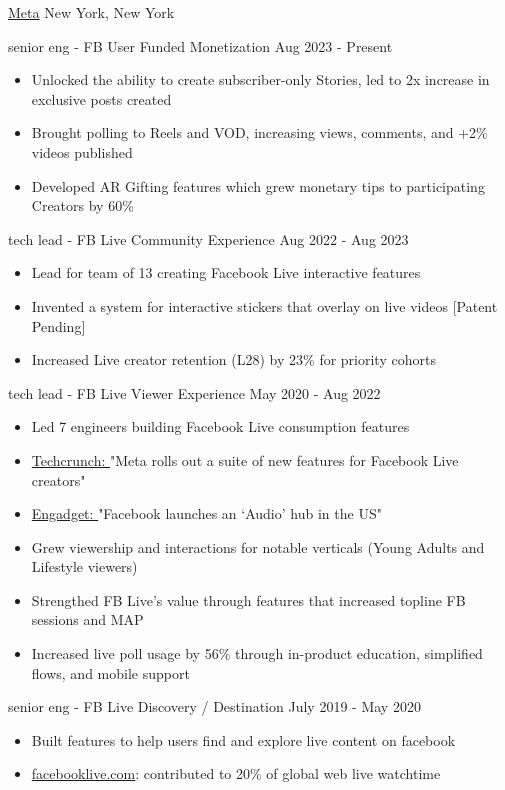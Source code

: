 \documentclass[11pt]{article}
\begin{document}
\headedsection  %
{\href{http://www.about.fb.com/}{Meta}}
{New York, New York}
{
    \headedsubsection
    {senior eng - FB User Funded Monetization }
    {Aug 2023 - Present}
    {
        \begin{itemize}
            \item Unlocked the ability to create subscriber-only Stories, led to 2x increase in exclusive posts created 
            \item Brought polling to Reels and VOD, increasing views, comments, and +2\% videos published
            \item Developed AR Gifting features which grew monetary tips to participating Creators by 60\%
        \end{itemize}
    }
    \headedsubsection
    {tech lead - FB Live Community Experience}
    {Aug 2022 - Aug 2023}
    {
        \begin{itemize}
            \item Lead for team of 13 creating Facebook Live interactive features
            \item Invented a system for interactive stickers that overlay on live videos [Patent Pending]
            \item Increased Live creator retention (L28) by 23\% for priority cohorts
        \end{itemize}
    }
    \headedsubsection
    {tech lead - FB Live Viewer Experience}
    {May 2020 - Aug 2022}
    {
        \begin{itemize}
            \item Led 7 engineers building Facebook Live consumption features
            \item 
                \href{https://techcrunch.com/2021/12/09/meta-rolls-out-a-suite-of-new-features-and-discovery-tools-for-facebook-live-creators}{Techcrunch: }
                "Meta rolls out a suite of new features for Facebook Live creators"
            \item 
                \href{https://www.engadget.com/facebook-audio-content-hub-live-audio-rooms-podcasts-170633543.html}
                {Engadget: }
                "Facebook launches an ‘Audio’ hub in the US"
            \item Grew viewership and interactions for notable verticals (Young Adults and Lifestyle viewers)
            \item Strengthed FB Live's value through features that increased topline FB sessions and MAP
            \item Increased live poll usage by 56\% through in-product education, simplified flows, and mobile support
        \end{itemize}
    }
    \headedsubsection
    {senior eng - FB Live Discovery / Destination} 
    {July 2019 - May 2020}
    {
        \begin{itemize}
            \item Built features to help users find and explore live content on facebook 
            \item {\href{http://www.facebooklive.com/}{facebooklive.com}}: contributed to 20\% of global web live watchtime
        \end{itemize}

}}
\end{document}
